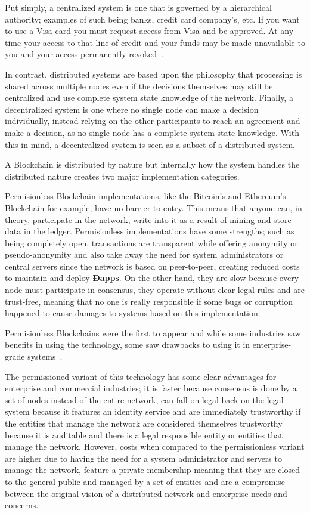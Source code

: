 Put simply, a centralized system is one that is
governed by a hierarchical authority; examples of such being banks, credit card
company’s, etc. If you want to use a Visa card you must request access from
Visa and be approved. At any time your access to that line of credit and your
funds may be made unavailable to you and your access permanently revoked~\cite{Dreifuerst2018}.

In contrast, distributed systems are based upon the philosophy that processing is shared across multiple nodes even if the decisions themselves may still be  centralized and use complete system state knowledge of the network. Finally, a decentralized system is one where no single node can make a
decision individually, instead relying on the other participants to reach an agreement and make a decision, as no single node has a complete system state knowledge. With this in mind, a decentralized system is seen as a subset of a distributed system.

A Blockchain is distributed by nature but internally how the system handles the distributed nature creates two major implementation categories.

Permisionless Blockchain implementations, like the Bitcoin's and Ethereum's Blockchain for example, have no barrier to entry. This means that anyone can, in theory, participate in the network, write into it as a result of mining and store data in the ledger. Permisionless implementations have some strengths; such as being completely open, transactions are transparent while offering anonymity or pseudo-anonymity and also take away the need for system administrators or central servers since the network is based on peer-to-peer, creating reduced costs to maintain and deploy \textbf{Ðapps}. On the other hand, they are slow because every node must participate in consensus, they operate without clear legal rules and are trust-free, meaning that no one is really responsible if some bugs or corruption happened to cause damages to systems based on this implementation.

Permisionless Blockchains were the first to appear and while some industries saw benefits in using the technology, some saw drawbacks to using it in enterprise-grade systems~\cite{Gopinath2016}.

The permissioned variant of this technology has some clear advantages for enterprise and commercial industries; it is faster because consensus is done by a set of nodes instead of the entire network, can fall on legal back on the legal system because it features an identity service and are immediately trustworthy if the entities that manage the network are considered themselves trustworthy because it is auditable and there is a legal responsible entity or entities that manage the network. However, costs when compared to the permissionless variant are higher due to having the need for a system administrator and servers to manage the network, feature a private membership meaning that they are closed to the general public and managed by a set of entities and are a compromise between the original vision of a distributed network and enterprise needs and concerns. 

